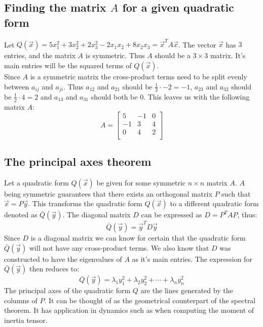 \documentclass[11pt, a4paper]{article}
\begin{document}
\subsection{Finding the matrix $A$ for a given quadratic form}
Let $Q(\vec{x}) = 5x_1^2 + 3x_2^2 + 2x_3^2 - 2x_1x_2 + 8x_2x_3 = \vec{x}^TA\vec{x}$.
The vector $\vec{x}$ has $3$ entries, and the matrix $A$ is symmetric. Thus $A$ should be a $3 \times 3$ matrix. It's main entries will be the squared terms of $Q(\vec{x})$.\\
Since $A$ is a symmetric matrix the cross-product terms need to be split evenly between $a_{ij}$ and $a_{ji}$. Thus $a_{12}$ and $a_{21}$ should be $\frac{1}{2}\cdot -2 = -1$, $a_{23}$ and $a_{32}$ should be $\frac{1}{2}\cdot 4 = 2$ and $a_{13}$ and $a_{31}$ should both be $0$. This leaves us with the following matrix $A$:
\begin{equation*}
  A = 
  \begin{bmatrix}
    5 & -1 & 0\\
    -1 & 3 & 4\\
    0 & 4 & 2\\  
  \end{bmatrix}
\end{equation*}


\subsection{The principal axes theorem}
Let a quadratic form $Q(\vec{x})$ be given for some symmetric $n \times n $ matrix $A$. $A$ being symmetric guarantees that there exists an orthogonal matrix $P$ such that $\vec{x} = P\vec{y}$. This transforms the quadratic form $Q(\vec{x})$ to a different quadratic form denoted as $\bar{Q}(\vec{y})$. The diagonal matrix $D$ can be expressed as $D = P^TAP$, thus:
\begin{equation}
  \bar{Q}(\vec{y}) = \vec{y}^T D \vec{y}
\end{equation}
Since $D$ is a diagonal matrix we can know for certain that the quadratic form $\bar{Q}(\vec{y})$ will not have any cross-product terms. We also know that $D$ was constructed to have the eigenvalues of $A$ as it's main entries. The expression for $\bar{Q}(\vec{y})$ then reduces to:
\begin{equation}
  \bar{Q}(\vec{y}) = \lambda_1 y_1^2 + \lambda_2 y_2^2 + \cdots + \lambda_n y_n^2
\end{equation}
The principal axes of the quadratic form $Q$ are the lines generated by the columns of $P$. It can be thought of as the geometrical counterpart of the spectral theorem. It has application in dynamics such as when computing the moment of inertia tensor.
\end{document}
